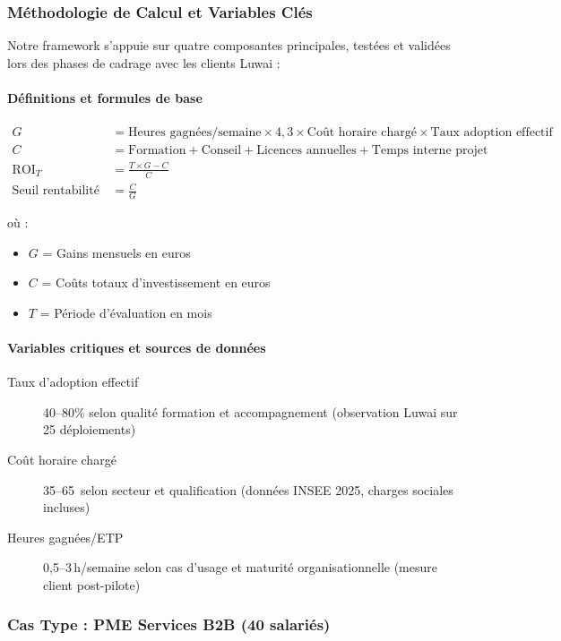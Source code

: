 \subsubsection{Méthodologie de Calcul et Variables Clés}

Notre framework s'appuie sur quatre composantes principales, testées et validées lors des phases de cadrage avec les clients Luwai :

\paragraph{Définitions et formules de base}
\begin{align}
G &= \text{Heures gagnées/semaine} \times 4{,}3 \times \text{Coût horaire chargé} \times \text{Taux adoption effectif} \\
C &= \text{Formation} + \text{Conseil} + \text{Licences annuelles} + \text{Temps interne projet} \\
\text{ROI}_T &= \frac{T \times G - C}{C} \\
\text{Seuil rentabilité (mois)} &= \frac{C}{G}
\end{align}

où :
\begin{itemize}
    \item \(G\) = Gains mensuels en euros
    \item \(C\) = Coûts totaux d'investissement en euros
    \item \(T\) = Période d'évaluation en mois
\end{itemize}

\paragraph{Variables critiques et sources de données}
\begin{description}
    \item[Taux d'adoption effectif] 40--80\% selon qualité formation et accompagnement (observation Luwai sur 25 déploiements)
    \item[Coût horaire chargé] 35--65\,\texteuro{} selon secteur et qualification (données INSEE 2025, charges sociales incluses)
    \item[Heures gagnées/ETP] 0{,}5--3\,h/semaine selon cas d'usage et maturité organisationnelle (mesure client post-pilote)
\end{description}

\subsubsection{Cas Type : PME Services B2B (40 salariés)}

